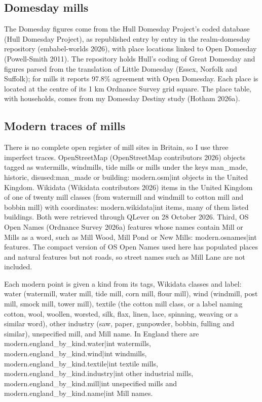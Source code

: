 \documentclass[11pt,a4paper]{article}
\begin{document}
\subsection{Domesday mills}

The Domesday figures come from the Hull Domesday Project's coded database (Hull Domesday Project), as republished entry by entry in the realm-domesday repository (embabel-worlds 2026), with place locations linked to Open Domesday (Powell-Smith 2011). The repository holds Hull's coding of Great Domesday and figures parsed from the translation of Little Domesday (Essex, Norfolk and Suffolk); for mills it reports 97.8\% agreement with Open Domesday. Each place is located at the centre of its 1 km Ordnance Survey grid square. The place table, with households, comes from my Domesday Destiny study (Hotham 2026a).

\subsection{Modern traces of mills}

There is no complete open register of mill sites in Britain, so I use three imperfect traces. OpenStreetMap (OpenStreetMap contributors 2026) objects tagged as watermills, windmills, tide mills or mills under the keys man\_made, historic, disused:man\_made or building: {{modern.osm|int}} objects in the United Kingdom. Wikidata (Wikidata contributors 2026) items in the United Kingdom of one of twenty mill classes (from watermill and windmill to cotton mill and bobbin mill) with coordinates: {{modern.wikidata|int}} items, many of them listed buildings. Both were retrieved through QLever on 28 October 2026. Third, OS Open Names (Ordnance Survey 2026a) features whose names contain Mill or Mills as a word, such as Mill Wood, Mill Pond or New Mills: {{modern.osnames|int}} features. The compact version of OS Open Names used here has populated places and natural features but not roads, so street names such as Mill Lane are not included.

Each modern point is given a kind from its tags, Wikidata classes and label: water (watermill, water mill, tide mill, corn mill, flour mill), wind (windmill, post mill, smock mill, tower mill), textile (the cotton mill class, or a label naming cotton, wool, woollen, worsted, silk, flax, linen, lace, spinning, weaving or a similar word), other industry (saw, paper, gunpowder, bobbin, fulling and similar), unspecified mill, and Mill name. In England there are {{modern.england_by_kind.water|int}} watermills, {{modern.england_by_kind.wind|int}} windmills, {{modern.england_by_kind.textile|int}} textile mills, {{modern.england_by_kind.industry|int}} other industrial mills, {{modern.england_by_kind.mill|int}} unspecified mills and {{modern.england_by_kind.name|int}} Mill names.
\end{document}
